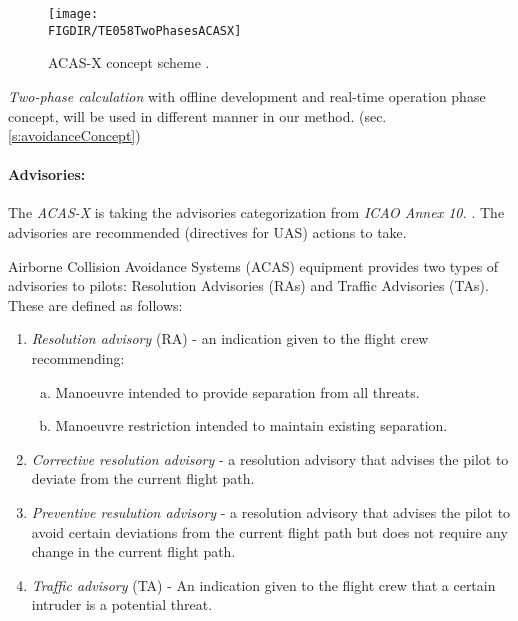\begin{figure}[H]
    \centering
    \texttt{[image: \\FIGDIR/TE058TwoPhasesACASX]}
    \caption{ACAS-X concept scheme \cite{netalert2013n17}.}
    \label{fig:acasxConceptScheme}
\end{figure}

\begin{note}
    \emph{Two-phase calculation} with offline development and real-time operation phase concept, will be used in different manner in our method. (sec. \ref{s:avoidanceConcept})
\end{note}

\paragraph{Advisories:} The \emph{ACAS-X} is taking the advisories categorization from \emph{ICAO Annex 10.} \cite{annex200710}. The advisories are recommended (directives for UAS) actions to take.


Airborne Collision Avoidance Systems (ACAS) equipment provides two types of advisories to pilots: Resolution Advisories (RAs) and Traffic Advisories (TAs). These are defined as follows:

\begin{enumerate}
    
    \item \emph{Resolution advisory} (RA) - an indication given to the flight crew recommending:
    
    \begin{enumerate}[a.]
        \item Manoeuvre intended to provide separation from all threats.
        
        \item Manoeuvre restriction intended to maintain existing separation.
    \end{enumerate}
    
    \item \emph{Corrective resolution advisory} - a resolution advisory that advises the pilot to deviate from the current flight path.
    
    \item \emph{Preventive resulution advisory} - a resolution advisory that advises the pilot to avoid certain deviations from the current flight path but does not require any change in the current flight path.

    \item \emph{Traffic advisory} (TA) - An indication given to the flight crew that a certain intruder is a potential threat.
\end{enumerate}

